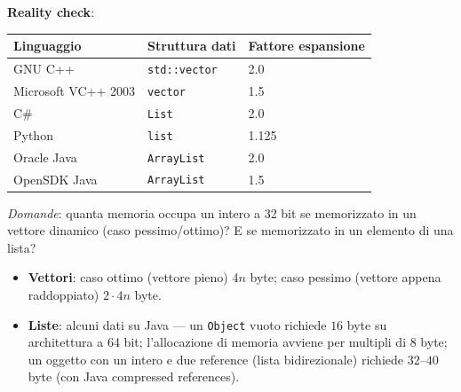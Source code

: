 \documentclass[12pt, a4paper]{article}
\begin{document}
\textbf{Reality check}:
\begin{center}
\begin{tabular}{lll}
\toprule
\textbf{Linguaggio} & \textbf{Struttura dati} & \textbf{Fattore espansione} \\
\midrule
GNU C++              & \texttt{std::vector} & 2.0 \\
Microsoft VC++ 2003   & \texttt{vector}      & 1.5 \\
C\#                   & \texttt{List}        & 2.0 \\
Python                & \texttt{list}        & 1.125 \\
Oracle Java           & \texttt{ArrayList}   & 2.0 \\
OpenSDK Java          & \texttt{ArrayList}   & 1.5 \\
\bottomrule
\end{tabular}
\end{center}

\begin{tcolorbox}[colback=lightergray!5, colframe=tocsubsec, title=\textbf{Non Ancora Convinti? Allocazione Memoria}]
\textit{Domande}: quanta memoria occupa un intero a 32 bit se memorizzato in un vettore dinamico (caso pessimo/ottimo)? E se memorizzato in un elemento di una lista?
\begin{itemize}
    \item \textbf{Vettori}: caso ottimo (vettore pieno) $4n$ byte; caso pessimo (vettore appena raddoppiato) $2\cdot 4n$ byte.
    \item \textbf{Liste}: alcuni dati su Java — un \texttt{Object} vuoto richiede $16$ byte su architettura a 64 bit; l'allocazione di memoria avviene per multipli di $8$ byte; un oggetto con un intero e due reference (lista bidirezionale) richiede $32$--$40$ byte (con Java compressed references).
\end{itemize}
\end{tcolorbox}
\end{document}
